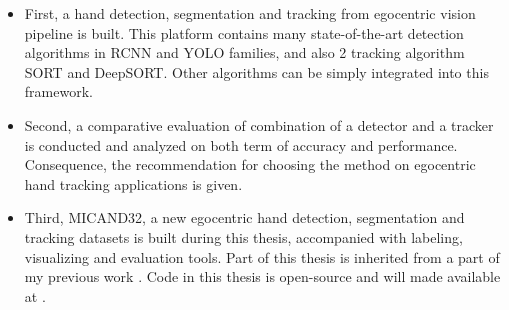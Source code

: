 \begin{itemize}
	\item First, a hand detection, segmentation and tracking from egocentric vision pipeline is built. This platform contains many state-of-the-art detection algorithms in RCNN and YOLO families, and also 2 tracking algorithm SORT and DeepSORT. Other algorithms can be simply integrated into this framework.
	\item Second, a comparative evaluation of combination of a detector and a tracker is conducted and analyzed on both term of accuracy and performance. Consequence, the recommendation for choosing the method on egocentric hand tracking applications is given.
	\item Third, MICAND32, a new egocentric hand detection, segmentation and tracking datasets is built during this thesis, accompanied with labeling, visualizing and evaluation tools.
	Part of this thesis is inherited from a part of my previous work \cite{tien}. Code in this thesis is open-source and will made available at .
\end{itemize}
